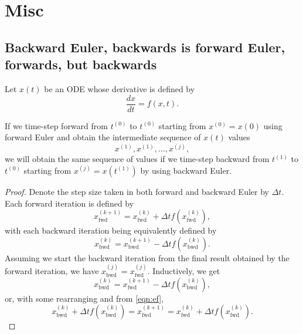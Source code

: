 \documentclass{article}
\theoremstyle{definition}
\begin{document}
\appendix
\section{Misc}
\subsection{Backward Euler, backwards is forward Euler, forwards, but backwards}\label{app:back_euler}
Let $x(t)$ be an ODE whose derivative is defined by
\begin{equation}
  \frac{dx}{dt} = f\left(x, t\right).
\end{equation}

If we time-step forward from $t^{(0)}$ to $t^{(0)}$ starting from $x^{(0)}=x(0)$ using forward Euler and obtain the intermediate sequence of $x(t)$ values
\begin{equation}
  x^{(1)}, x^{(1)}, \ldots, x^{(j)},
\end{equation}
we will obtain the same sequence of values if we time-step backward from $t^{(1)}$ to $t^{(0)}$ starting from $x^{(j)}=x\left(t^{(1)}\right)$ by using backward Euler.
\begin{proof}
  Denote the step size taken in both forward and backward Euler by $\Delta t$.  Each forward iteration is defined by
  \begin{equation}
    x^{(k+1)}_{\text{fwd}} = x^{(k)}_{\text{fwd}} + \Delta t f\left(x^{(k)}_{\text{fwd}}\right), \label{eqn:ef}
  \end{equation}
  with each backward iteration being equivalently defined by
  \begin{equation}
    x^{(k)}_{\text{bwd}} = x^{(k+1)}_{\text{bwd}} - \Delta t f\left(x^{(k)}_{\text{bwd}}\right). \label{eqn:eb}
  \end{equation}
  Assuming we start the backward iteration from the final result obtained by the forward iteration, we have $x^{(j)}_{\text{bwd}} = x^{(j)}_{\text{fwd}}$.  Inductively, we get
  \begin{equation}
    x^{(k)}_{\text{bwd}} = x^{(k+1)}_{\text{fwd}} - \Delta t f\left(x^{(k)}_{\text{bwd}}\right),
  \end{equation}
  or, with some rearranging and from \cref{eqn:ef},
  \begin{equation}
      x^{(k)}_{\text{bwd}} + \Delta t f\left(x^{(k)}_{\text{bwd}}\right) = x^{(k+1)}_{\text{fwd}} = x^{(k)}_{\text{fwd}} + \Delta t f\left(x^{(k)}_{\text{fwd}}\right).
  \end{equation}
\end{proof}


\end{document}
